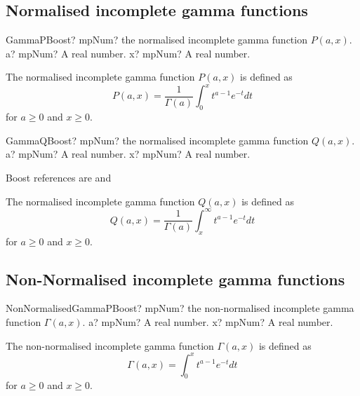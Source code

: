 \subsection{Normalised incomplete gamma functions}
\label{IncompleteGammaFunction}

\begin{mpFunctionsExtract}
	\mpFunctionTwo
	{GammaPBoost? mpNum? the normalised incomplete gamma function $P(a,x)$.}
	{a? mpNum? A real number.}
	{x? mpNum? A real number.}
\end{mpFunctionsExtract}

\vspace{0.3cm}
The normalised incomplete gamma function $P(a,x)$ is defined as
\begin{equation}
	P(a,x)=\frac{1}{\Gamma(a)} \int_0^x t^{a-1} e^{-t}dt
\end{equation}
for $a \geq 0$ and $x \geq 0$.

\vspace{0.6cm}
\begin{mpFunctionsExtract}
	\mpFunctionTwo
	{GammaQBoost? mpNum? the normalised incomplete gamma function $Q(a,x)$.}
	{a? mpNum? A real number.}
	{x? mpNum? A real number.}
\end{mpFunctionsExtract}


Boost references are \cite{Temme_1979} and \cite{Temme_1994}



\vspace{0.3cm}
The normalised incomplete gamma function $Q(a,x)$ is defined as
\begin{equation}
	Q(a,x)=\frac{1}{\Gamma(a)} \int_x^{\infty} t^{a-1} e^{-t}dt
\end{equation}
for $a \geq 0$ and $x \geq 0$.



\subsection{Non-Normalised incomplete gamma functions}

\begin{mpFunctionsExtract}
	\mpFunctionTwo
	{NonNormalisedGammaPBoost? mpNum? the non-normalised incomplete gamma function $\Gamma(a,x)$.}
	{a? mpNum? A real number.}
	{x? mpNum? A real number.}
\end{mpFunctionsExtract}

\vspace{0.3cm}
The non-normalised incomplete gamma function $\Gamma(a,x)$ is defined as
\begin{equation}
	\Gamma(a,x)= \int_0^x t^{a-1} e^{-t}dt
\end{equation}
for $a \geq 0$ and $x \geq 0$.

